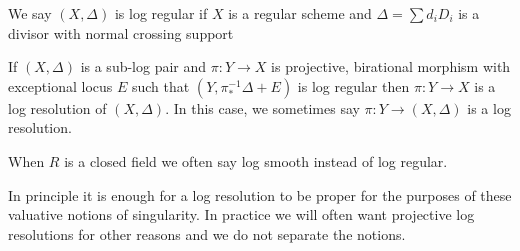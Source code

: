\begin{definition}
	
	We say $(X,\Delta)$ is log regular if $X$ is a regular scheme and $\Delta=\sum d_{i}D_{i}$ is a divisor with normal crossing support
	
	If $(X,\Delta)$ is a sub-log pair and $\pi\colon Y \to X$ is projective, birational morphism with exceptional locus $E$ such that $(Y,\pi^{-1}_{*}\Delta+E)$ is log regular then $\pi\colon Y\to X$ is a log resolution of $(X,\Delta)$. In this case, we sometimes say $\pi\colon Y \to (X,\Delta)$ is a log resolution.
	
\end{definition}

When $R$ is a closed field we often say log smooth instead of log regular.

\begin{remark}
	
	In principle it is enough for a log resolution to be proper for the purposes of these valuative notions of singularity. In practice we will often want projective log resolutions for other reasons and we do not separate the notions.
	
	\end{remark}

